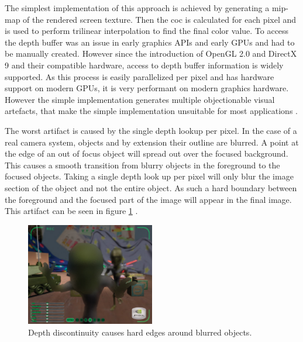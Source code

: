 The simplest implementation of this approach is achieved by generating a mip-map of the rendered screen texture.
Then the \gls{coc} is calculated for each pixel and is used to perform trilinear interpolation to find the final color value.
To access the depth buffer was an issue in early graphics APIs and early GPUs and had to be manually created.
However since the introduction of OpenGL 2.0 and DirectX 9 and their compatible hardware, access to depth buffer information is widely supported.
As this process is easily parallelized per pixel and has hardware support on modern GPUs, it is very performant on modern graphics hardware.
However the simple implementation generates multiple objectionable visual artefacts, that make the simple implementation unsuitable for most applications \cite{Demers.2005, Hammon.2008}.

The worst artifact is caused by the single depth lookup per pixel.
In the case of a real camera system, objects and by extension their outline are blurred.
A point at the edge of an out of focus object will spread out over the focused background.
This causes a smooth transition from blurry objects in the foreground to the focused objects.
Taking a single depth look up per pixel will only blur the image section of the object and not the entire object.
As such a hard boundary between the foreground and the focused part of the image will appear in the final image.
This artifact can be seen in figure \ref{fig:depth-discontinuity} \cite{Demers.2005}.


\begin{figure}[h]
    \centering
    \includegraphics[width=0.5\textwidth]{images/depth-discontinuity.jpg}
    \caption{Depth discontinuity causes hard edges around blurred objects. \cite{Demers.2005}}
    \label{fig:depth-discontinuity}
\end{figure}

